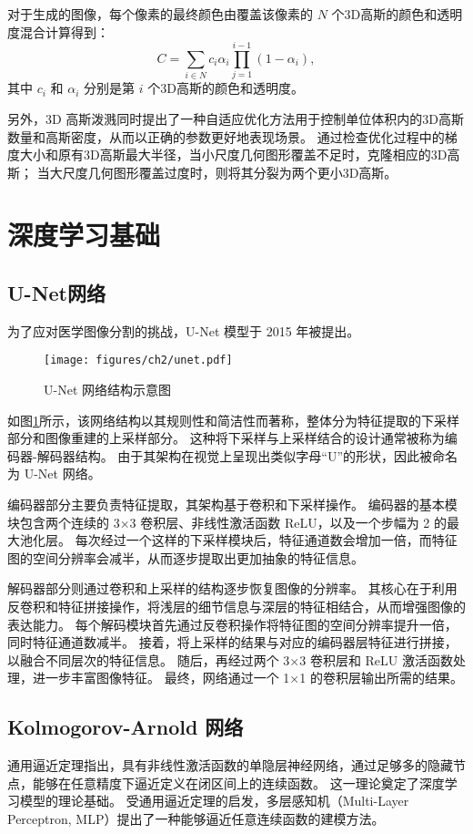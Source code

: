 对于生成的图像，每个像素的最终颜色由覆盖该像素的 $N$ 个3D高斯的颜色和透明度混合计算得到：
\begin{equation}
\label{formula: splatting&volume rendering}
    C = \sum_{i\in N}c_i \alpha_i \prod_{j=1}^{i-1} (1-\alpha_i),
\end{equation}
其中 $c_i$ 和 $\alpha_i$ 分别是第 $i$ 个3D高斯的颜色和透明度。

另外，3D 高斯泼溅同时提出了一种自适应优化方法用于控制单位体积内的3D高斯数量和高斯密度，从而以正确的参数更好地表现场景。
通过检查优化过程中的梯度大小和原有3D高斯最大半径，当小尺度几何图形覆盖不足时，克隆相应的3D高斯；
当大尺度几何图形覆盖过度时，则将其分裂为两个更小3D高斯。

\section{深度学习基础}
\subsection{U-Net网络}
为了应对医学图像分割的挑战，U-Net 模型\cite{unet}于 2015 年被提出。
\begin{figure}
    \centering
    \texttt{[image: figures/ch2/unet.pdf]}
    \caption{U-Net 网络结构示意图}
    \label{img:unet}
\end{figure}

如图\ref{img:unet}所示，该网络结构以其规则性和简洁性而著称，整体分为特征提取的下采样部分和图像重建的上采样部分。
这种将下采样与上采样结合的设计通常被称为编码器-解码器结构。
由于其架构在视觉上呈现出类似字母“U”的形状，因此被命名为 U-Net 网络。

编码器部分主要负责特征提取，其架构基于卷积和下采样操作。
编码器的基本模块包含两个连续的 3×3 卷积层、非线性激活函数 ReLU，以及一个步幅为 2 的最大池化层。
每次经过一个这样的下采样模块后，特征通道数会增加一倍，而特征图的空间分辨率会减半，从而逐步提取出更加抽象的特征信息。

解码器部分则通过卷积和上采样的结构逐步恢复图像的分辨率。
其核心在于利用反卷积和特征拼接操作，将浅层的细节信息与深层的特征相结合，从而增强图像的表达能力。
每个解码模块首先通过反卷积操作将特征图的空间分辨率提升一倍，同时特征通道数减半。
接着，将上采样的结果与对应的编码器层特征进行拼接，以融合不同层次的特征信息。
随后，再经过两个 3×3 卷积层和 ReLU 激活函数处理，进一步丰富图像特征。
最终，网络通过一个 1×1 的卷积层输出所需的结果。

\subsection{Kolmogorov-Arnold 网络}
通用逼近定理\cite{universal_approximation}指出，具有非线性激活函数的单隐层神经网络，通过足够多的隐藏节点，能够在任意精度下逼近定义在闭区间上的连续函数。
这一理论奠定了深度学习模型的理论基础。
受通用逼近定理的启发，多层感知机（Multi-Layer Perceptron, MLP）\cite{mlp}提出了一种能够逼近任意连续函数的建模方法。

